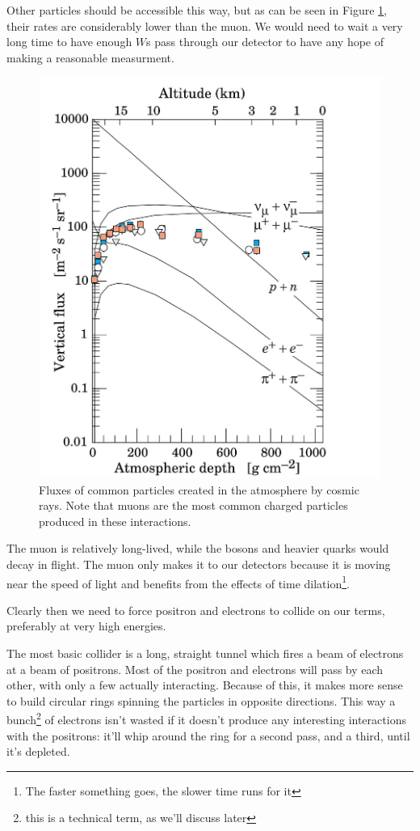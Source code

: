 Other particles should be accessible this way, but as can be seen in Figure \ref{Fig:Detect:Rates}, their rates are considerably lower than the muon. We would need to wait a very long time to have enough $W$s pass through our detector to have any hope of making a reasonable measurment.
\begin{figure}[h!]
    \centering
        \includegraphics[width=\textwidth]{F3/atmodepth}
        \caption{Fluxes of common particles created in the atmosphere by cosmic rays. Note that muons are the most common charged particles produced in these interactions.}
        \label{Fig:Detect:Rates}
\end{figure}
The muon is relatively long-lived, while the bosons and heavier quarks would decay in flight. The muon only makes it to our detectors because it is moving near the speed of light and benefits from the effects of time dilation\footnote{The faster something goes, the slower time runs for it}.

Clearly then we need to force positron and electrons to collide on our terms, preferably at very high energies.

The most basic collider is a long, straight tunnel which fires a beam of electrons at a beam of positrons. Most of the positron and electrons will pass by each other, with only a few actually interacting. Because of this, it makes more sense to build circular rings spinning the particles in opposite directions. This way a bunch\footnote{this is a technical term, as we'll discuss later} of electrons isn't wasted if it doesn't produce any interesting interactions with the positrons: it'll whip around the ring for a second pass, and a third, until it's depleted.

